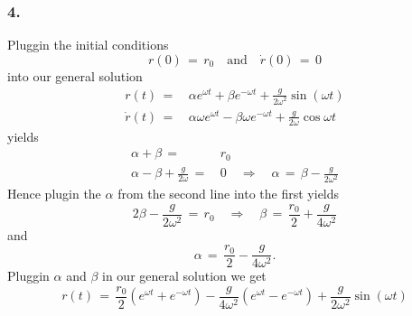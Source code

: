 \documentclass{report}
\begin{document}
\subsubsection{4.}
Pluggin the initial conditions
\begin{equation*}
  r(0) \,=\, r_0 \quad \text{and} \quad \dot r(0) \,=\, 0 
\end{equation*}
into our general solution
\begin{align*}
  r(t) \,=\,& \alpha e^{\omega t} + \beta e^{-\omega t} + \frac{g}{2\omega^2}
\sin(\omega t) \\
  \dot r(t) \,=\,& \alpha \omega e^{\omega t} - \beta \omega e^{-\omega t} +
\frac{g}{2\omega} \cos{\omega t}
\end{align*}
yields
\begin{align*}
  \alpha + \beta \,=\,& r_0 \\
  \alpha - \beta + \frac{g}{2\omega} \,=\,& 0 \quad \Rightarrow \quad \alpha
\,=\, \beta - \frac{g}{2\omega^2}
\end{align*}
Hence plugin the $\alpha$ from the second line into the first yields
\begin{equation*}
  2\beta - \frac{g}{2\omega^2} \,=\, r_0 \quad \Rightarrow \quad \beta \,=\,
\frac{r_0}{2} + \frac{g}{4\omega^2}
\end{equation*}
and 
\begin{equation*}
  \alpha \,=\, \frac{r_0}{2} - \frac{g}{4\omega^2}.
\end{equation*}
Pluggin $\alpha$ and $\beta$ in our general solution we get
\begin{equation*}
  r(t) \,=\, \frac{r_0}{2} \left(e^{\omega t} + e^{-\omega t}\right) -
\frac{g}{4\omega^2} \left(e^{\omega t} - e^{-\omega t}\right) +
\frac{g}{2\omega^2} \sin(\omega t)
\end{equation*}
\end{document}
